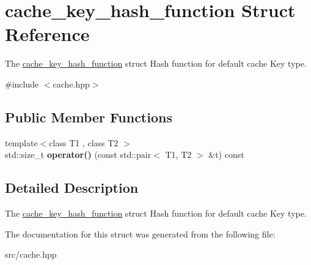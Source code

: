 \hypertarget{structcache__key__hash__function}{}\section{cache\+\_\+key\+\_\+hash\+\_\+function Struct Reference}
\label{structcache__key__hash__function}


The \mbox{\hyperlink{structcache__key__hash__function}{cache\+\_\+key\+\_\+hash\+\_\+function}} struct Hash function for default cache Key type.  




{\ttfamily \#include $<$cache.\+hpp$>$}

\subsection*{Public Member Functions}
\begin{DoxyCompactItemize}
\item 
\mbox{\label{structcache__key__hash__function_ad0d1ca9649949be5a06533282ce5f8d2}} 
{\footnotesize template$<$class T1 , class T2 $>$ }\\std\+::size\+\_\+t {\bfseries operator()} (const std\+::pair$<$ T1, T2 $>$ \&t) const
\end{DoxyCompactItemize}


\subsection{Detailed Description}
The \mbox{\hyperlink{structcache__key__hash__function}{cache\+\_\+key\+\_\+hash\+\_\+function}} struct Hash function for default cache Key type. 

The documentation for this struct was generated from the following file\+:\begin{DoxyCompactItemize}
\item 
src/cache.\+hpp\end{DoxyCompactItemize}
